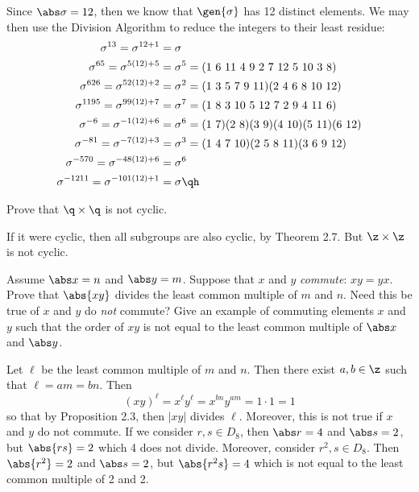 \begin{sol}
    Since $\abs\sigma = 12$, then we know that $\gen{\sigma}$ has 12 distinct elements. We may then use the Division Algorithm to reduce the integers to their least residue:
    \begin{align*}
        \sigma^{13} = \sigma^{12 + 1} & = \sigma \\
        \sigma^{65} = \sigma^{5(12) + 5} & = \sigma^5 = (1\ 6\ 11\ 4\ 9\ 2\ 7\ 12\ 5\ 10\ 3\ 8) \\
        \sigma^{626} = \sigma^{52(12) + 2} & = \sigma^2 = (1\ 3\ 5\ 7\ 9\ 11)(2\ 4\ 6\ 8\ 10\ 12) \\
        \sigma^{1195} = \sigma^{99(12) + 7} & = \sigma^7 = (1\ 8\ 3\ 10\ 5\ 12\ 7\ 2\ 9\ 4\ 11\ 6) \\
        \sigma^{-6} = \sigma^{-1(12) + 6} & = \sigma^6 = (1\ 7)(2\ 8)(3\ 9)(4\ 10)(5\ 11)(6\ 12) \\
        \sigma^{-81} = \sigma^{-7(12) + 3} & = \sigma^3 = (1\ 4\ 7\ 10)(2\ 5\ 8\ 11)(3\ 6\ 9\ 12) \\
        \sigma^{-570} = \sigma^{-48(12) + 6} & = \sigma^6 \\
        \sigma^{-1211} = \sigma^{-101(12) + 1} & = \sigma \qh
    \end{align*}
\end{sol}


\begin{exercise}\label{ex2.3.15}
    Prove that $\q \times \q$ is not cyclic.
\end{exercise}

\begin{sol}
    If it were cyclic, then all subgroups are also cyclic, by Theorem 2.7. But $\z \times \z$ is not cyclic.
\end{sol}

\begin{exercise}\label{ex2.3.16}
    Assume $\abs x = n$ and $\abs y = m$. Suppose that $x$ and $y$ \emph{commute}: $xy = yx$. Prove that $\abs{xy}$ divides the least common multiple of $m$ and $n$. Need this be true of $x$ and $y$ do \emph{not} commute? Give an example of commuting elements $x$ and $y$ such that the order of $xy$ is not equal to the least common multiple of $\abs x$ and $\abs y$.
\end{exercise}

\begin{sol}
    Let $\ell$ be the least common multiple of $m$ and $n$. Then there exist $a, b \in \z$ such that $\ell = am = bn$. Then
    \[(xy)^\ell = x^\ell y^\ell = x^{bn}y^{am} = 1 \cdot 1 = 1\]
    so that by Proposition 2.3, then $|xy|$ divides $\ell$. Moreover, this is not true if $x$ and $y$ do not commute. If we consider $r, s \in D_8$, then $\abs r = 4$ and $\abs s = 2$, but $\abs{rs} = 2$ which 4 does not divide. Moreover, consider $r^2, s \in D_8$. Then $\abs{r^2} = 2$ and $\abs s = 2$, but $\abs{r^2s} = 4$ which is not equal to the least common multiple of 2 and 2.
\end{sol}


